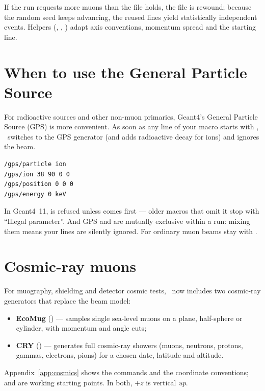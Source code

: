 If the run requests more muons than the file holds, the file is rewound; because the random seed keeps advancing, the reused lines yield statistically independent events. Helpers (, , ) adapt axis conventions, momentum spread and the starting line.

\section{When to use the General Particle Source}
For radioactive sources and other non-muon primaries, Geant4's General Particle Source (GPS) is more convenient. As soon as any line of your macro starts with , \musrSim\ switches to the GPS generator (and adds radioactive decay for ions) and ignores the  beam.

\begin{lstlisting}[style=mac,caption={A radioactive $^{90}$Sr source via GPS (from \texttt{102.mac})}]
/gps/particle ion
/gps/ion 38 90 0 0
/gps/position 0 0 0
/gps/energy 0 keV
\end{lstlisting}

\begin{pitfall}
In Geant4~11,  is refused unless  comes first --- older macros that omit it stop with ``Illegal parameter''. And GPS and  are mutually exclusive within a run: mixing them means your  lines are silently ignored. For ordinary muon beams stay with .
\end{pitfall}

\section{Cosmic-ray muons}
\begin{newin}
For muography, shielding and detector cosmic tests, \musrSim\ now includes two cosmic-ray generators that replace the beam model:
\begin{itemize}
  \item \textbf{EcoMug} () --- samples single sea-level muons on a plane, half-sphere or cylinder, with momentum and angle cuts;
  \item \textbf{CRY} () --- generates full cosmic-ray showers (muons, neutrons, protons, gammas, electrons, pions) for a chosen date, latitude and altitude.
\end{itemize}
Appendix~\ref{app:cosmics} shows the commands and the coordinate conventions;  and  are working starting points. In both, \(+z\) is vertical \emph{up}.
\end{newin}

